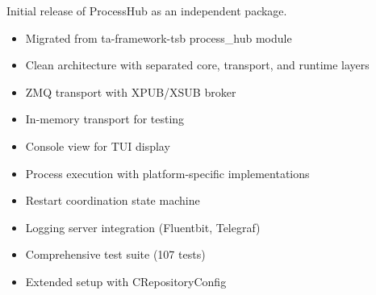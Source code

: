 Initial release of ProcessHub as an independent package.

\begin{itemize}
   \item Migrated from ta-framework-tsb process\_hub module
   \item Clean architecture with separated core, transport, and runtime layers
   \item ZMQ transport with XPUB/XSUB broker
   \item In-memory transport for testing
   \item Console view for TUI display
   \item Process execution with platform-specific implementations
   \item Restart coordination state machine
   \item Logging server integration (Fluentbit, Telegraf)
   \item Comprehensive test suite (107 tests)
   \item Extended setup with CRepositoryConfig
\end{itemize}

